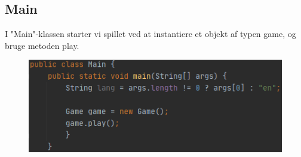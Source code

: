 \subsection{Main}
I "Main"-klassen starter vi spillet ved at instantiere et objekt af typen game, og bruge metoden play.

\begin{figure}[H]
    \centering
    \includegraphics{sources/7_implementering/MainBillede1.png}
    \label{fig:logicWin}
\end{figure}